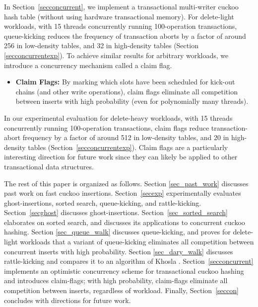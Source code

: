 \documentclass{sig-alternate-05-2015}
\begin{document}
In Section~\ref{secconcurrent}, we implement a transactional
multi-writer cuckoo hash table (without using hardware transactional
memory). For delete-light workloads, with 15 threads concurrently
running 100-operation transactions, queue-kicking reduces the
frequency of transaction aborts by a factor of around 256 in
low-density tables, and 32 in high-density tables (Section
\ref{secconcurrentexp}). To achieve similar results for arbitrary
workloads, we introduce a concurrency mechanism called a claim flag.
\begin{itemize}
  \item \textbf{Claim Flags: } By marking which slots have been
    scheduled for kick-out chains (and other write operations), claim
    flags eliminate all competition between inserts with high
    probability (even for polynomially many threads).
\end{itemize}
In our experimental evaluation for delete-heavy workloads, with 15
threads concurrently running 100-operation transactions, claim flags
reduce transaction-abort frequency by a factor of around 512 in
low-density tables, and 20 in high-density tables
(Section~\ref{secconcurrentexp}). Claim flags are a particularly
interesting direction for future work since they can likely be applied
to other transactional data structures.

The rest of this paper is organized as follows. Section
\ref{sec_past_work} discusses past work on fast cuckoo
insertions. Section~\ref{secexp} experimentally evaluates
ghost-insertions, sorted search, queue-kicking, and
rattle-kicking. Section~\ref{secghost} discusses ghost-insertions.
Section~\ref{sec_sorted_search} elaborates on sorted search, and
discusses its applications to concurrent cuckoo hashing. Section
\ref{sec_queue_walk} discusses queue-kicking, and proves for
delete-light workloads that a variant of queue-kicking eliminates all
competition between concurrent inserts with high probability. Section
\ref{sec_dary_walk} discusses rattle-kicking and compares it to an
algorithm of Khosla \cite{khosla13}. Section~\ref{secconcurrent}
implements an optimistic concurrency scheme for transactional cuckoo
hashing and introduces claim-flags; with high probability, claim-flags
eliminate all competition between inserts, regardless of
workload. Finally, Section~\ref{seccon} concludes with directions for
future work.
 
\end{document}
